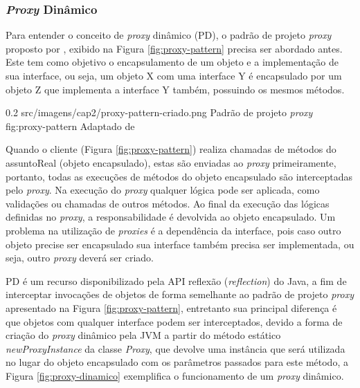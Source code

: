 \subsubsection{\textit{Proxy} Dinâmico}

\par Para entender o conceito de \textit{proxy} dinâmico (PD), o padrão de projeto \textit{proxy} proposto por , exibido na Figura \ref{fig:proxy-pattern} precisa ser abordado antes. Este tem como objetivo o encapsulamento de um objeto e a implementação de sua interface, ou seja, um objeto X com uma interface Y é encapsulado por um objeto Z que implementa a interface Y também, possuindo os mesmos métodos.

\begin{image}
{0.2} %
{src/imagens/cap2/proxy-pattern-criado.png} %
{Padrão de projeto \textit{proxy}} %
{fig:proxy-pattern} %
{Adaptado de \cite{gamma1995design}} %
\end{image}


\par Quando o cliente (Figura \ref{fig:proxy-pattern}) realiza chamadas de métodos do assuntoReal (objeto encapsulado), estas são enviadas ao \textit{proxy} primeiramente, 
portanto, todas as execuções de métodos do objeto encapsulado são interceptadas pelo \textit{proxy}. Na execução do \textit{proxy} qualquer lógica pode ser aplicada, como validações ou chamadas de outros métodos. Ao final da execução das lógicas definidas no \textit{proxy}, a responsabilidade é devolvida ao objeto encapsulado. Um problema na utilização de \textit{proxies} é a dependência da interface, pois caso outro objeto precise ser encapsulado sua interface também precisa ser implementada, ou seja, outro \textit{proxy} deverá ser criado.

\par PD é um recurso disponibilizado pela API reflexão (\textit{reflection}) do Java, a fim de interceptar invocações de objetos de forma semelhante ao padrão de projeto \textit{proxy} apresentado na Figura \ref{fig:proxy-pattern}, entretanto sua principal diferença é que objetos com qualquer interface podem ser interceptados, devido a forma de criação do \textit{proxy} dinâmico pela JVM a partir do método estático \textit{newProxyInstance} da classe \textit{Proxy}, que devolve uma instância que será utilizada no lugar do objeto encapsulado com os parâmetros passados para este método, a Figura \ref{fig:proxy-dinamico} exemplifica o funcionamento de um \textit{proxy} dinâmico. 

